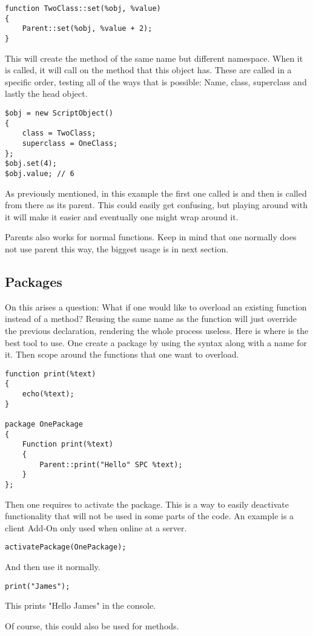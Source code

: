 \begin{lstlisting}[style=ts]
function TwoClass::set(%obj, %value)
{
	Parent::set(%obj, %value + 2);
}
\end{lstlisting}

This will create the method of the same name but different namespace. When it is called, it will call on the  method that this object has. These are called in a specific order, testing all of the ways that is possible: Name, class, superclass and lastly the head object.

\begin{lstlisting}[style=ts]
$obj = new ScriptObject()
{
	class = TwoClass;
	superclass = OneClass;
};
$obj.set(4);
$obj.value; // 6
\end{lstlisting}

As previously mentioned, in this example the first one called is  and then  is called from there as its parent. This could easily get confusing, but playing around with it will make it easier and eventually one might wrap around it.

Parents also works for normal functions. Keep in mind that one normally does not use parent this way, the biggest usage is in next section.

\subsection{Packages}

On this arises a question: What if one would like to overload an existing function instead of a method? Reusing the same name as the function will just override the previous declaration, rendering the whole process useless. Here is where  is the best tool to use.
One create a package by using the syntax  along with a name for it. Then scope around the functions that one want to overload.

\begin{lstlisting}[style=ts]
function print(%text)
{
	echo(%text);
}

package OnePackage
{
	Function print(%text)
	{
		Parent::print("Hello" SPC %text);
	}
};
\end{lstlisting}

Then one requires to activate the package. This is a way to easily deactivate functionality that will not be used in some parts of the code. An example is a client Add-On only used when online at a server.

\begin{lstlisting}[style=ts]
activatePackage(OnePackage);
\end{lstlisting}

And then use it normally.

\begin{lstlisting}[style=ts]
print("James");
\end{lstlisting}

This prints "Hello James" in the console.

Of course, this could also be used for methods.
